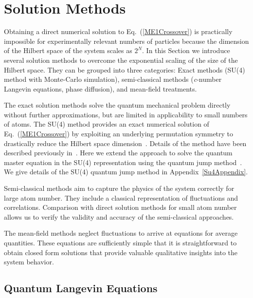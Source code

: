 \documentclass[aps,
twocolumn,
showpacs,
superscriptaddress,groupedaddress]{revtex4}
\begin{document}
\section{Solution Methods}
\label{sec:Methods}

Obtaining a direct numerical solution to Eq.~(\ref{ME1Crossover}) is
practically impossible for experimentally relevant numbers of
particles because the dimension of the Hilbert space of the system
scales as $2^N$.  In this Section we introduce several solution
methods to overcome the exponential scaling of the size of the Hilbert
space.  They can be grouped into three categories: Exact methods
(SU(4) method with Monte-Carlo simulation), semi-classical methods
({\it c}-number Langevin equations, phase diffusion), and mean-field
treatments.

The exact solution methods solve the quantum mechanical problem directly
without further approximations, but are limited in applicability to
small numbers of atoms. The SU(4) method provides an exact numerical
solution of Eq.~(\ref{ME1Crossover}) by exploiting an underlying
permutation symmetry to drastically reduce the Hilbert space
dimension~\cite{Hartmann:arXiv1201.1732, PhysRevA.87.062101}. Details of
the method have been described previously in~\cite{PhysRevA.87.062101}.
Here we extend the approach to solve the quantum master equation in the
SU(4) representation using the quantum jump
method~\cite{Dalibard92,Dum92,Knight98}.  We give details of the SU(4)
quantum jump method in Appendix~\ref{Su4Appendix}.

Semi-classical methods aim to capture the physics of the system
correctly for large atom number.  They include a classical
representation of fluctuations and correlations.  Comparison with
direct solution methods for small atom number allows us to verify the
validity and accuracy of the semi-classical approaches.

The mean-field methods neglect fluctuations to arrive at equations for
average quantities. These equations are sufficiently simple that it is
straightforward to obtain closed form solutions that provide valuable
qualitative insights into the system behavior.



\subsection{Quantum Langevin Equations}
\end{document}

